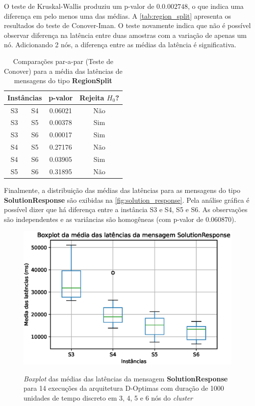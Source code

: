 O teste de Kruskal-Wallis produziu um p-valor de $0.0.002748$, o que indica uma diferença em pelo menos uma das médias. A \autoref{tab:region_split} apresenta os resultados do teste de Conover-Iman. O teste novamente indica que não é possível observar diferença na latência entre duas amostras com a variação de apenas um nó. Adicionando 2 nós, a diferença entre as médias da latência é significativa. 

\begin{table}[ht!]
    \centering
    \caption{Comparações par-a-par (Teste de Conover) para a média das latências de mensagens do tipo \textbf{RegionSplit}}
    \begin{tabular}{cccc}
    \toprule
    \multicolumn{2}{c}{\textbf{Instâncias}} & \textbf{p-valor} & \textbf{Rejeita $H_0$?}\\
    \midrule
       S3  &  S4  &  0.06021  &  Não \\
       S3  &  S5  &  0.00378  &   Sim \\
       S3  &  S6  &  0.00017  &   Sim \\
       S4  &  S5  &  0.27176  &  Não \\
       S4  &  S6  &  0.03905  &   Sim \\
       S5  &  S6  &  0.31895  &  Não \\
     \bottomrule
    \end{tabular}
    \label{tab:region_split}
\end{table}


Finalmente, a distribuição das médias das latências para as mensagens do tipo \textbf{SolutionResponse} são exibidas na \autoref{fig:solution_response}. Pela análise gráfica é possível dizer que há diferença entre a instância S3 e S4, S5 e S6. As observações são independentes e as variâncias são homogêneas (com p-valor de $0.060870$). 

\begin{figure}
    \centering    
    \caption{\textit{Boxplot} das médias das latências da mensagem \textbf{SolutionResponse} para 14 execuções da arquitetura D-Optimas com duração de 1000 unidades de tempo discreto em 3, 4, 5 e 6 nós do \textit{cluster} }
    \includegraphics[scale=0.8]{imagens/solution_response.eps}
    \label{fig:solution_response}
\end{figure}

